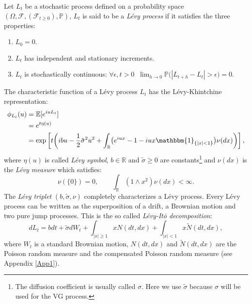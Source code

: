 \documentclass[]{interact}
\newcommand{\numberset}{\mathbb}
\newcommand{\R}{\numberset{R}}
\newcommand{\PP}{\numberset{P}}
\theoremstyle{plain}%
\theoremstyle{definition}
\theoremstyle{remark}
\begin{document}
Let $L_t$ be a stochastic process defined on a probability space $(\Omega,\mathcal{F},(\mathcal{F}_{t \ge 0}),\PP)$,
$L_t$ is said to be a \emph{Lévy process} if it satisfies the three properties:
\begin{enumerate}
 \item $L_{0}=0$.
 \item $L_t$ has independent and stationary increments.
 \item $L_t$ is stochastically continuous: 
 $\forall \epsilon,t > 0 \; \; \lim_{h\to 0} \PP \bigl( |L_{t+h}-L_t|>\epsilon \bigr)=0.  $
\end{enumerate}
The characteristic function of a Lévy process $L_t$ has the Lévy-Khintchine representation:
\begin{align}\label{LevyKin}
\phi_{L_t}(u)  &= \mathbb{E} [e^{iu L_t}]  \\ 
	   &= e^{t \eta(u)} \nonumber \\
	   &= \exp \left[t \biggl( ibu - \frac{1}{2} \tilde \sigma^2 u^2 + \int_{\R} 
	   \bigl( e^{i u x} -1 -iux \mathbbm{1}_{\{|x|<1\}} \bigr) \nu(dx) \biggr) \right], \nonumber		      
\end{align}
where $\eta(u)$ is called \emph{Lévy symbol}, $b\in \R$ and $\tilde \sigma \geq 0$ are constants\footnote{The diffusion coefficient is usually called $\sigma$.
Here we use $\tilde \sigma$ because $\sigma$ will be used for the VG process.} 
and $\nu(dx)$ is the \emph{Lévy measure}
which satisfies:
\begin{equation}\label{Levy_m}
 \nu (\{ 0 \} ) = 0, \hspace{2em}
 \int_{\R} (1\wedge x^2) \nu(dx) < \infty.
\end{equation}
The \emph{Lévy triplet} $(b,\tilde \sigma,\nu)$ completely characterizes a Lévy process.
Every Lévy process can be written as the superposition of a drift, a Brownian motion and two pure jump processes.
This is the so called \emph{Lévy-It\={o} decomposition}: 
\begin{equation}\label{Levy_Ito}
  dL_t = bdt + \tilde \sigma dW_t + \int_{|x|\geq1} x N(dt,dx) + \int_{|x|<1} x \tilde{N}(dt,dx),
\end{equation}
where $W_t$ is a standard Brownian motion, 
$N(dt,dx)$ and $\tilde N(dt,dx)$ are the Poisson random measure and the compensated Poisson random measure (see Appendix \ref{App1}).
\end{document}
